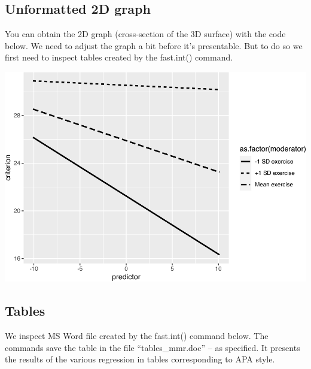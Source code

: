 \documentclass[
]{krantz}
\makeatletter
\newenvironment{Shaded}{\begin{snugshade}}{\end{snugshade}}
\newcommand{\FunctionTok}[1]{\textcolor[rgb]{0,0,0}{#1}}
\newcommand{\NormalTok}[1]{#1}
\newcommand{\OtherTok}[1]{\textcolor[rgb]{0.37,0.37,0.37}{#1}}
\newcommand{\SpecialCharTok}[1]{\textcolor[rgb]{0,0,0}{#1}}
\newenvironment{kframe}{%
\medskip{}
\setlength{\fboxsep}{.8em}
 \def\at@end@of@kframe{}%
 \ifinner\ifhmode%
  \def\at@end@of@kframe{\end{minipage}}%
  \begin{minipage}{\columnwidth}%
 \fi\fi%
 \def\FrameCommand##1{\hskip\@totalleftmargin \hskip-\fboxsep
 \colorbox{shadecolor}{##1}\hskip-\fboxsep
     \hskip-\linewidth \hskip-\@totalleftmargin \hskip\columnwidth}%
 \MakeFramed {\advance\hsize-\width
   \@totalleftmargin\z@ \linewidth\hsize
   \@setminipage}}%
 {\par\unskip\endMakeFramed%
 \at@end@of@kframe}
\renewenvironment{Shaded}{\begin{kframe}}{\end{kframe}}
\makeatother
\begin{document}
\hypertarget{unformatted-2d-graph}{%
\subsection{Unformatted 2D graph}\label{unformatted-2d-graph}}

You can obtain the 2D graph (cross-section of the 3D surface) with the code below. We need to adjust the graph a bit before it's presentable. But to do so we first need to inspect tables created by the fast.int() command.

\begin{Shaded}
\end{Shaded}

\includegraphics{bookdown_files/figure-latex/unnamed-chunk-489-1.pdf}

\hypertarget{tables}{%
\subsection{Tables}\label{tables}}

We inspect MS Word file created by the fast.int() command below. The commands save the table in the file ``tables\_mmr.doc'' -- as specified. It presents the results of the various regression in tables corresponding to APA style.
\end{document}
